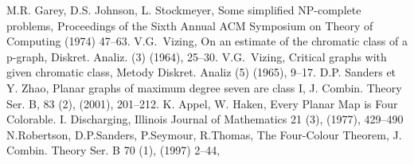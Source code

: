 \documentclass[10pt,a4paper]{article}
\begin{document}
\begin{thebibliography}{99}



 M.R. Garey, D.S. Johnson, L. Stockmeyer, Some simplified NP-complete problems, Proceedings of the Sixth Annual ACM Symposium on Theory of Computing (1974) 47--63.
 V.G.~Vizing, On an estimate of the chromatic class of a p-graph, Diskret. Analiz. (3) (1964), 25--30.
 V.G.~Vizing, Critical graphs with given chromatic class, Metody Diskret. Analiz (5) (1965), 9--17.
 D.P. Sanders et Y. Zhao, Planar graphs of maximum degree seven are class I, J. Combin. Theory Ser. B, {83} (2), (2001), 201--212.
 K. Appel, W. Haken, Every Planar Map is Four Colorable. I. Discharging, Illinois Journal of Mathematics 21 (3), (1977), 429--490
 N.Robertson, D.P.Sanders, P.Seymour, R.Thomas, The Four-Colour Theorem, J. Combin. Theory Ser. B 70 (1), (1997)  2--44,
\end{thebibliography}
\end{document}

